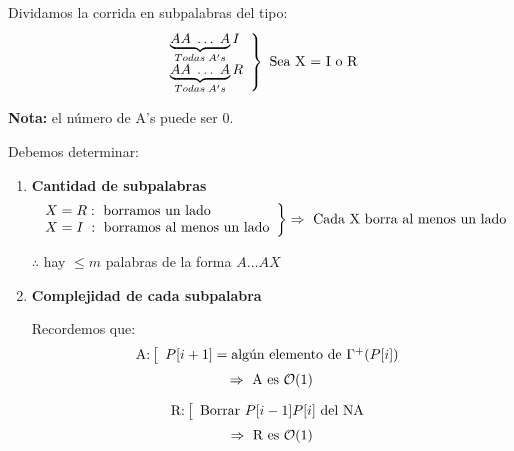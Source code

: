 \documentclass[12pt,a4paper]{report}
\begin{document}
			\par Dividamos la corrida en subpalabras del tipo:
			\begin{equation*}
		  	\left.
		  	\begin{array}{l}
		    	\underbrace{AA \; \dotsc \; A}_{Todas \; A's}I \\
		    	\underbrace{AA \; \dotsc \; A}_{Todas \; A's}R
		  	\end{array}
		  	\right\rbrace
		  	\textup{ Sea X = I o R}
			\end{equation*}

			\par \textbf{Nota:} el número de A's puede ser 0.
			\vspace{5mm}
			\par Debemos determinar:
			\begin{enumerate}
				\item \textbf{Cantidad de subpalabras}
					\begin{equation*}
						\left.
						\begin{array}{l}
							X = R: \textup{ borramos un lado} \\
							X = I \; : \textup{ borramos al menos un lado}
						\end{array}
						\right\rbrace
						\Rightarrow \textup{ Cada X borra al menos un lado}
					\end{equation*}
					\begin{center}
						$\therefore$ hay $\leq m$ palabras de la forma $A \dotsc A X$
					\end{center}
				\item \textbf{Complejidad de cada subpalabra}
					\par Recordemos que:
					\begin{equation*}
						\textup{A:}
						\left[
						\begin{array}{l}
							P[i + 1] = \textup{algún elemento de } \Gamma^{+}(P[i]) \\
						\end{array}
						\right.
					\end{equation*}
					\[ \Rightarrow \textup{ A es } \mathcal{O}(1) \]

					\begin{equation*}
						\textup{R:}
						\left[
						\begin{array}{l}
							\textup{Borrar } P[i - 1]P[i] \textup{ del NA} \\
						\end{array}
						\right.
					\end{equation*}
					\[ \Rightarrow \textup{ R es } \mathcal{O}(1) \]


\end{enumerate}
\end{document}
